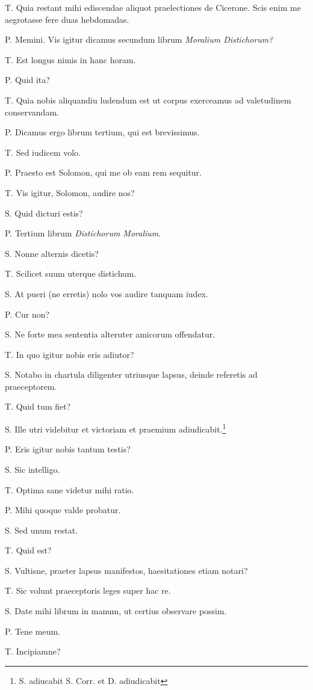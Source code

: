 \documentclass{article}
\begin{document}
T. Quia restant mihi ediscendae aliquot praelectiones de Cicerone. Scis enim me aegrotasse fere duas hebdomadas. 

P. Memini. Vis igitur dicamus secundum librum \emph{Moralium Distichorum?}

T. Est longus nimis in hanc horam. 

P. Quid ita?

T. Quia nobis aliquandiu ludendum est ut corpus exerceamus ad valetudinem conservandam. 

P. Dicamus ergo librum tertium, qui est brevissimus. 

T. Sed iudicem volo. 

P. Praesto est Solomon, qui me ob eam rem sequitur.

T. Vis igitur, Solomon, audire nos?

S. Quid dicturi estis?

P. Tertium librum \emph{Distichorum Moralium}. 

S. Nonne alternis dicetis?

T. Scilicet suum uterque distichum. 

S. At pueri (ne erretis) nolo vos audire tanquam iudex. 

P. Cur non?

S. Ne forte mea sententia alteruter amicorum offendatur. 

T. In quo igitur nobis eris adiutor?

S. Notabo in chartula diligenter utriusque lapsus, deinde referetis ad praeceptorem. 

T. Quid tum fiet?

S. Ille utri videbitur et victoriam et praemium adiudicabit.\footnote{S. adiucabit S. Corr. et D. adiudicabit}

P. Eris igitur nobis tantum testis?

S. Sic intelligo. 

T. Optima sane videtur mihi ratio. 

P. Mihi quoque valde probatur. 

S. Sed unum restat. 

T. Quid est?

S. Vultisne, praeter lapsus manifestos, haesitationes etiam notari?

T. Sic volunt praeceptoris leges super hac re. 

S. Date mihi librum in manum, ut certius observare possim. 

P. Tene meum. 

T. Incipiamne?
\end{document}

